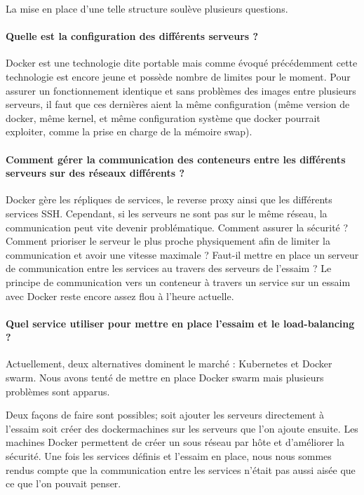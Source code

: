 \par La mise en place d’une telle structure soulève plusieurs questions.

\paragraph{Quelle est la configuration des différents serveurs ?} 

\par Docker est une technologie dite portable mais comme évoqué précédemment cette technologie est encore jeune et possède nombre de limites pour le moment. Pour assurer un fonctionnement identique et sans problèmes des images entre plusieurs serveurs, il faut que ces dernières aient la même configuration (même version de docker, même kernel, et même configuration système que docker pourrait exploiter, comme la prise en charge de la mémoire swap). 

\paragraph{Comment gérer la communication des conteneurs entre les différents serveurs sur des réseaux différents ?} 

\par Docker gère les répliques de services, le reverse proxy ainsi que les différents services SSH. Cependant, si les serveurs ne sont pas sur le même réseau, la communication peut vite devenir problématique. Comment assurer la sécurité ? Comment prioriser le serveur le plus proche physiquement afin de limiter la communication et avoir une vitesse maximale ? Faut-il mettre en place un serveur de communication entre les services au travers des serveurs de l’essaim ? Le principe de communication vers un conteneur à travers un service sur un essaim avec Docker reste encore assez flou à l’heure actuelle. 

\paragraph{Quel service utiliser pour mettre en place l’essaim et le load-balancing ?}

\par Actuellement, deux alternatives dominent le marché : Kubernetes et Docker swarm. Nous avons tenté de mettre en place Docker swarm mais plusieurs problèmes sont apparus. \\

\par Deux façons de faire sont possibles; soit ajouter les serveurs directement à l’essaim soit créer des \gls{dockermachine}s sur les serveurs que l’on ajoute ensuite. Les machines Docker permettent de créer un sous réseau par hôte et d’améliorer la sécurité. Une fois les services définis et l’essaim en place, nous nous sommes rendus compte que la communication entre les services n’était pas aussi aisée que ce que l’on pouvait penser. 

